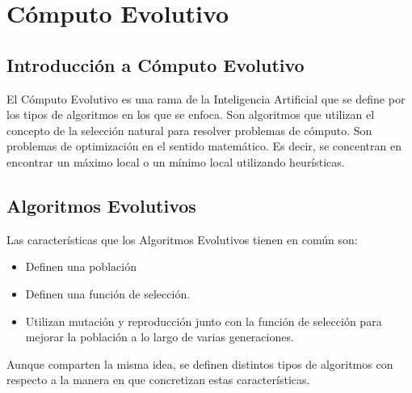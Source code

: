 
\chapter{Cómputo Evolutivo}\label{ch:evolucion}

\section{Introducción a Cómputo Evolutivo}

El Cómputo Evolutivo es una rama de la Inteligencia Artificial que se define
por los tipos de algoritmos en los que se enfoca. Son algoritmos que utilizan
el concepto de la selección natural para resolver problemas de cómputo. Son
problemas de optimización en el sentido matemático. Es decir, se concentran en
encontrar un máximo local o un mínimo local utilizando heurísticas.


\section{Algoritmos Evolutivos}

Las características que los Algoritmos Evolutivos tienen en común son:

\begin{itemize}
\item Definen una población
\item Definen una función de selección.
\item Utilizan mutación y reproducción junto con la función de selección para
mejorar la población a lo largo de varias generaciones.
\end{itemize}

Aunque comparten la misma idea, se definen distintos tipos de algoritmos con
respecto a la manera en que concretizan estas características.

